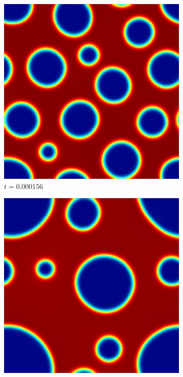 \begin{figure}[ht]
	\begin{subfigure}[t]{.3\linewidth}
		\center
		\includegraphics[scale=.25]{stochastic_ch_6_156}
		\vspace{-.4\baselineskip}
		\caption{$t=0.000156$}
	\end{subfigure}
	\begin{subfigure}[t]{.3\linewidth}
		\center
		\includegraphics[scale=.25]{stochastic_ch_7_2136}

\end{subfigure}
\end{figure}
